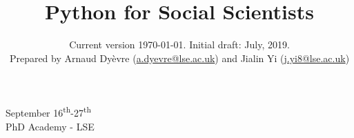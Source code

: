 \documentclass{amsart}
\theoremstyle{definition}
\theoremstyle{remark}
\numberwithin{equation}{section}
\begin{document}
\title{Python for Social Scientists}




\date{Current version \today. Initial draft: July, 2019. \\
Prepared by Arnaud Dy\`evre (\href{
mailto:a.dyevre@lse.ac.uk}{a.dyevre@lse.ac.uk}) and Jialin Yi (\href{
mailto:j.yi8@lse.ac.uk}{j.yi8@lse.ac.uk})}




\maketitle

\begin{center}
    \Large September 16\textsuperscript{th}-27\textsuperscript{th} \\
    PhD Academy - LSE
\end{center}

\vspace{12pt}


\end{document}

